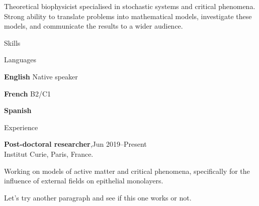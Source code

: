 \documentclass{fancycv}
\newlength{\sidebarwidth}
\begin{document}
\hfill{}

\vspace{0.7cm}

\raggedright Theoretical biophysicist specialised in stochastic systems and critical phenomena. Strong ability to translate problems into mathematical models, investigate these models, and communicate the results to a wider audience.

\vspace{1cm}

\begin{minipage}[t]{\sidebarwidth}
{\fontsize{32}{40} Skills}

\vspace{12cm}

{{\fontsize{32}{40} Languages}

\vspace{0.7cm}

\raggedright \textbf{English} \hfill {\slimjim Native speaker}\\
\vspace{0.5cm}
\raggedright \textbf{French} \hfill {\slimjim B2/C1}\\
\vspace{0.5cm}
\raggedright \textbf{Spanish} \hfill {\slimjim {}}
}
\end{minipage}\hspace{1.5cm}\begin{minipage}[t]{10.5cm}\setlength{\parskip}{0.5em}
{\fontsize{32}{40} Experience}

\vspace{0.7cm}

\textbf{Post-doctoral researcher},\hfill Jun 2019--Present\\
{\slimjim Institut Curie, Paris, France.}

Working on models of active matter and critical phenomena, specifically for the influence of external fields on epithelial monolayers.

Let's try another paragraph and see if this one works or not.

\vspace{0.7cm}


\end{minipage}
\end{document}
